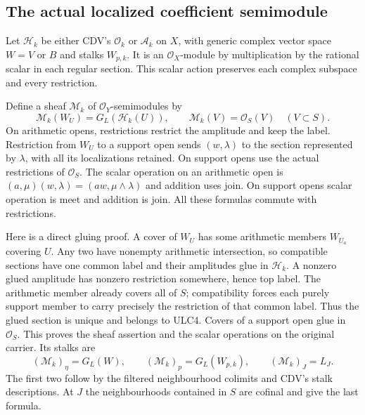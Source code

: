 \documentclass[11pt,a4paper]{article}
\theoremstyle{definition}\newtheorem{definition}[theorem]{Definition}
\begin{document}
\subsection{The actual localized coefficient semimodule}
Let $\mathcal H_k$ be either CDV's $\mathcal O_k$ or $\mathcal A_k$
on $X$, with generic complex vector space $W=V$ or $B$ and stalks
$W_{p,k}$. It is an $\mathcal O_X$-module by multiplication by the
rational scalar in each regular section. This scalar action preserves
each complex subspace and every restriction.

Define a sheaf $\mathcal M_k$ of $\mathcal O_Y$-semimodules by
\begin{equation}\tag{ULC4}
 \mathcal M_k(W_U)=G_L(\mathcal H_k(U)),\qquad
 \mathcal M_k(V)=\mathcal O_S(V)\quad(V\subset S).
\end{equation}
On arithmetic opens, restrictions restrict the amplitude and keep
the label. Restriction from $W_U$ to a support open sends
$(w,\lambda)$ to the section represented by $\lambda$, with all its
localizations retained. On support opens use the actual restrictions
of $\mathcal O_S$. The scalar operation on an arithmetic open is
$(a,\mu)(w,\lambda)=(aw,\mu\wedge\lambda)$ and addition uses join.
On support opens scalar operation is meet and addition is join.
All these formulas commute with restrictions.

Here is a direct gluing proof. A cover of $W_U$ has some arithmetic
members $W_{U_a}$ covering $U$. Any two have nonempty arithmetic
intersection, so compatible sections have one common label and their
amplitudes glue in $\mathcal H_k$. A nonzero glued amplitude has
nonzero restriction somewhere, hence top label. The arithmetic member
already covers all of $S$; compatibility forces each purely support
member to carry precisely the restriction of that common label.
Thus the glued section is unique and belongs to ULC4. Covers of a
support open glue in $\mathcal O_S$. This proves the sheaf assertion
and the scalar operations on the original carrier. Its stalks are
\begin{equation}\tag{ULC5}
 (\mathcal M_k)_\eta=G_L(W),\qquad
 (\mathcal M_k)_p=G_L(W_{p,k}),\qquad
 (\mathcal M_k)_J=L_J.
\end{equation}
The first two follow by the filtered neighbourhood colimits and CDV's
stalk descriptions. At $J$ the neighbourhoods contained in $S$ are
cofinal and give the last formula.
\end{document}
